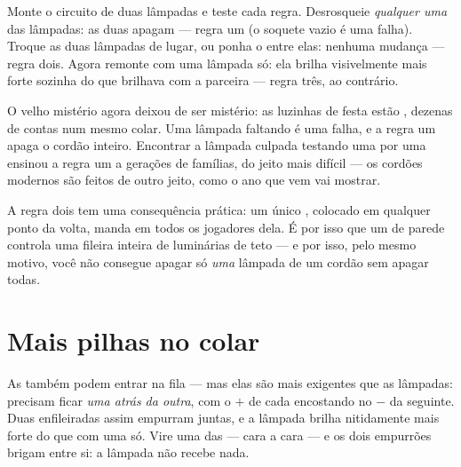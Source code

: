 \begin{example}\label{ex:g4:series-circuits:seeing}
Monte o circuito de duas lâmpadas e teste cada regra. Desrosqueie
\emph{qualquer uma} das lâmpadas: as duas apagam --- regra um (o
soquete vazio é uma falha). Troque as duas lâmpadas de lugar, ou
ponha o  entre elas: nenhuma mudança --- regra dois. Agora
remonte com uma lâmpada só: ela brilha visivelmente mais forte
sozinha do que brilhava com a parceira --- regra três, ao contrário.
\end{example}

\begin{example}\label{ex:g4:series-circuits:partylights}
O velho mistério agora deixou de ser mistério: as luzinhas de festa
estão , dezenas de contas num mesmo colar. Uma lâmpada
faltando é uma falha, e a regra um apaga o cordão inteiro. Encontrar
a lâmpada culpada testando uma por uma ensinou a regra um a gerações
de famílias, do jeito mais difícil --- os cordões modernos são feitos
de outro jeito, como o ano que vem vai mostrar.
\end{example}

\begin{remark}\label{rem:g4:series-circuits:switch}
A regra dois tem uma consequência prática: um único ,
colocado em qualquer ponto da volta, manda em todos os jogadores
dela. É por isso que um  de parede controla uma fileira
inteira de luminárias de teto --- e por isso, pelo mesmo motivo, você
não consegue apagar só \emph{uma} lâmpada de um cordão  sem
apagar todas.
\end{remark}

\section{Mais pilhas no colar}

\begin{example}\label{ex:g4:series-circuits:batteries}
As  também podem entrar na fila  --- mas elas são mais
exigentes que as lâmpadas: precisam ficar \emph{uma atrás da outra},
com o $+$ de cada  encostando no $-$ da seguinte. Duas 
enfileiradas assim empurram juntas, e a lâmpada brilha nitidamente
mais forte do que com uma só. Vire uma das  --- cara a cara ---
e os dois empurrões brigam entre si: a lâmpada não recebe nada.
\end{example}

